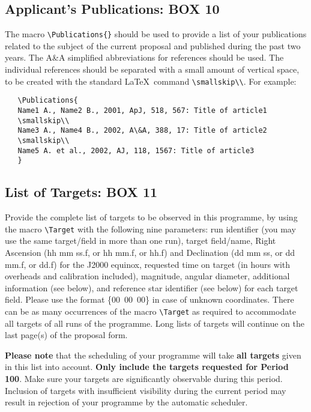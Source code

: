 \documentclass{article}
\begin{document}
\subsection{Applicant's  Publications: {\bf BOX 10}}

The macro \verb|\Publications{}| should be used to 
provide a list of your publications related to the
subject of the current proposal and published during the past two
years. The A\&A simplified abbreviations for references should be
used. The individual references should be separated with a small
amount of vertical space, to be created with the standard \LaTeX\
command \verb|\smallskip\\|. For example:
\begin{verbatim}
   \Publications{
   Name1 A., Name2 B., 2001, ApJ, 518, 567: Title of article1
   \smallskip\\
   Name3 A., Name4 B., 2002, A\&A, 388, 17: Title of article2
   \smallskip\\
   Name5 A. et al., 2002, AJ, 118, 1567: Title of article3
   }
\end{verbatim}

\subsection{List of Targets: {\bf BOX 11}}
  
Provide the complete list of targets to be observed in this programme,
by using the macro \verb|\Target| 
with the following nine parameters: run identifier (you may use the same
target/field in more than one run), target field/name, Right Ascension
(hh mm ss.f, or hh mm.f, or hh.f) and Declination (dd mm ss, or dd
mm.f, or dd.f) for the 
J2000 equinox, requested time on target (in hours
with overheads and calibration included), magnitude, angular diameter,
additional information (see below), and reference star identifier
(see below)
for each target field.  Please use the format \{00~00~00\}
in case of unknown coordinates. There can be as many occurrences of
the macro \verb|\Target| as required to accommodate all targets of all
runs of the programme. Long lists of targets will continue
on the last page(s) of the proposal form.

{\bf Please note} that the scheduling of your programme will take
{\bf all targets} given in this list into account. {\bf Only include
 the targets requested for Period 100}.
Make sure your targets
are significantly observable during this period.  Inclusion of targets
with insufficient visibility during the current period may result in
rejection of your programme by the automatic scheduler.
\end{document}
